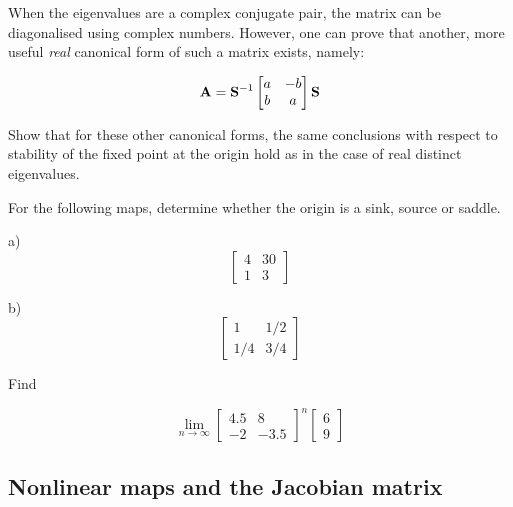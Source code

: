 When the eigenvalues are a complex conjugate pair, the matrix can be diagonalised using complex numbers. However, one can prove that another, more useful \emph{real} canonical form of such a matrix exists, namely:

\begin{equation}
{\bf A} = 
{\bf S}^{-1}
\begin{bmatrix}
a & -b \\
b & a
\end{bmatrix} 
{\bf S}
\end{equation} 

\begin{sidebar}
\begin{ex}
Show that for these other canonical forms, the same conclusions with respect to stability of the fixed point at the origin hold as in the case of real distinct eigenvalues.
\end{ex}
\end{sidebar}

\begin{sidebar}
\begin{ex}
For the following maps, determine whether the origin is a sink, source or saddle.

a) $$\begin{bmatrix}4 & 30 \\ 1 & 3 \end{bmatrix}$$

b) $$\begin{bmatrix}1 & 1/2 \\ 1/4 & 3/4 \end{bmatrix}$$

\end{ex}
\end{sidebar}

\begin{sidebar}
\begin{ex}
Find

$$\lim_{n \to \infty}\begin{bmatrix}4.5 & 8 \\ -2 & -3.5 \end{bmatrix} ^ n \begin{bmatrix} 6 \\ 9 \end{bmatrix}$$

\end{ex}
\end{sidebar}

\subsection{Nonlinear maps and the Jacobian matrix}

